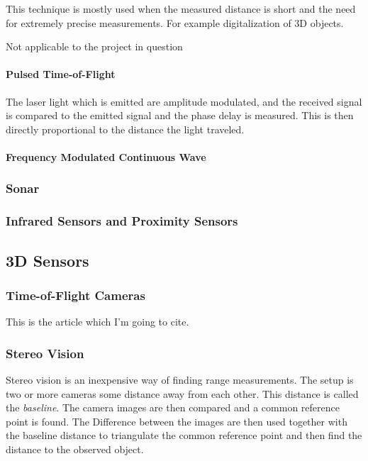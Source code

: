 This technique is mostly used when the measured distance is short and the need for
extremely precise measurements. For example digitalization of 3D objects. 

Not applicable to the project in question


\paragraph{Pulsed Time-of-Flight}
The laser light which is emitted are amplitude modulated, and the received signal is
compared to the emitted signal and the phase delay is measured. This is then directly
proportional to the distance the light traveled. 


\paragraph{Frequency Modulated Continuous Wave}




\subsubsection{Sonar}


\subsubsection{Infrared Sensors and Proximity Sensors}


\subsection{3D Sensors}


\subsubsection{Time-of-Flight Cameras}
This is the article which I'm going to cite. \cite{sr3000}



\subsubsection{Stereo Vision}
Stereo vision is an inexpensive way of finding range measurements. The setup is two or
more cameras some distance away from each other. This distance is called the
\emph{baseline}. The camera images are then compared and a common reference point is
found. The Difference between the images are then used together with the baseline distance
to triangulate the common reference point and then find the distance to the observed
object. 


